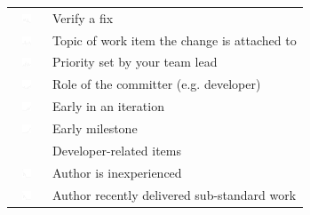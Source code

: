 \begin{table}[t!]
\begin{tabular}{ll}
\vspace{-2pt}\includegraphics[height=10px, width=30px]{figures/sparkles/you-need-to-verify-a-fix.pdf} & Verify a fix\\
\vspace{-2pt}\includegraphics[height=10px, width=30px]{figures/sparkles/topic-of-work-item-the-change-is-attached-to.pdf} & Topic of work item the change is attached to\\ 
\vspace{-2pt}\includegraphics[height=10px, width=30px]{figures/sparkles/priority-of-related-work-item-was-set-from-your-team-lead.pdf} & Priority set by your team lead\\
\vspace{-2pt}\includegraphics[height=10px, width=30px]{figures/sparkles/role-of-committer--e-g--developer--team-lead--intern.pdf} & Role of the committer (e.g. developer)\\
\vspace{-2pt}\includegraphics[height=10px, width=30px]{figures/sparkles/early-in-an-iteration.pdf} & Early in an iteration\\
\vspace{-2pt}\includegraphics[height=10px, width=30px]{figures/sparkles/early-milestone.pdf} & Early milestone\\
\midrule
\vspace{-2pt}& Developer-related items\\
\midrule
\vspace{-2pt}\includegraphics[height=10px, width=30px]{figures/sparkles/change-author-is-inexperienced.pdf} & Author is inexperienced\\
\vspace{-2pt}\includegraphics[height=10px, width=30px]{figures/sparkles/recent-work-of-low-quality.pdf} & Author recently delivered sub-standard work\\

\end{tabular}
\end{table}
